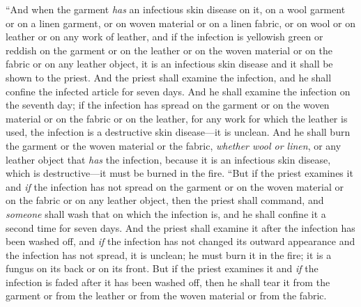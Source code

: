 \begin{biblechapter}
 “And when the garment \textit{has} an infectious skin disease on it, on a wool garment or on a linen garment,
\verse or on woven material or on a linen fabric, or on wool or on leather or on any work of leather,
\verse and if the infection is yellowish green or reddish on the garment or on the leather or on the woven material or on the fabric or on any leather object, it is an infectious skin disease and it shall be shown to the priest.
\verse And the priest shall examine the infection, and he shall confine the infected article for seven days.
\verse And he shall examine the infection on the seventh day; if the infection has spread on the garment or on the woven material or on the fabric or on the leather, for any work for which the leather is used, the infection is a destructive skin disease—it is unclean.
\verse And he shall burn the garment or the woven material or the fabric, \textit{whether wool or linen}, or any leather object that \textit{has} the infection, because it is an infectious skin disease, which is destructive—it must be burned in the fire.
\verse “But if the priest examines it and \textit{if} the infection has not spread on the garment or on the woven material or on the fabric or on any leather object,
\verse then the priest shall command, and \textit{someone} shall wash that on which the infection is, and he shall confine it a second time for seven days.
\verse And the priest shall examine it after the infection has been washed off, and \textit{if} the infection has not changed its outward appearance and the infection has not spread, it is unclean; he must burn it in the fire; it is a fungus on its back or on its front.
\verse But if the priest examines it and \textit{if} the infection is faded after it has been washed off, then he shall tear it from the garment or from the leather or from the woven material or from the fabric.

\end{biblechapter}
